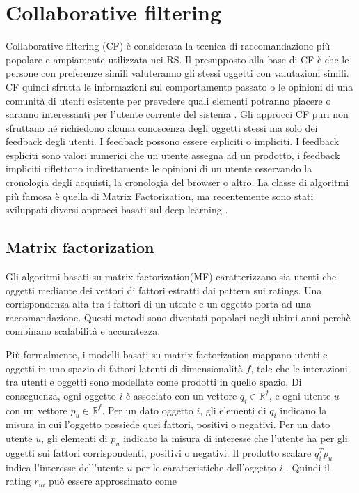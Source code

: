 \documentclass[12pt,italian]{report}
\begin{document}
\section{Collaborative filtering}
Collaborative filtering (CF) è considerata la tecnica di raccomandazione più popolare e ampiamente utilizzata nei RS. Il presupposto alla base di CF è che le persone con preferenze simili valuteranno gli stessi oggetti con valutazioni simili. CF quindi sfrutta le informazioni sul comportamento passato o le opinioni di una comunità di utenti esistente per prevedere quali elementi potranno piacere o saranno interessanti per l'utente corrente del sistema \cite{recsys-intro}. Gli approcci CF puri non sfruttano né richiedono alcuna conoscenza degli oggetti stessi ma solo dei feedback degli utenti. I feedback possono essere espliciti o impliciti. I feedback espliciti sono valori numerici che un utente assegna ad un prodotto, i feedback impliciti riflettono indirettamente le opinioni di un utente osservando la cronologia degli acquisti, la cronologia del browser o altro. 
La classe di algoritmi più famosa è quella di Matrix Factorization, ma recentemente sono stati sviluppati diversi approcci basati sul deep learning \cite{deep-learning-survey}.


\subsection{Matrix factorization}
Gli algoritmi basati su matrix factorization(MF) caratterizzano sia utenti che oggetti mediante dei vettori di fattori estratti dai pattern sui ratings. Una corrispondenza alta tra i fattori di un utente e un oggetto porta ad una raccomandazione. Questi metodi sono diventati popolari negli ultimi anni perchè combinano scalabilità e accuratezza.

Più formalmente, i modelli basati su matrix factorization mappano utenti e oggetti in uno spazio di fattori latenti di dimensionalità $f$, tale che le interazioni tra utenti e oggetti sono modellate come prodotti in quello spazio. Di conseguenza, ogni oggetto $i$ è associato con un vettore $q_i \in \mathbb{R}^f$, e ogni utente $u$ con un vettore $p_u \in \mathbb{R}^f$. Per un dato oggetto $i$, gli elementi di $q_i$ indicano la misura in cui l'oggetto possiede quei fattori, positivi o negativi. Per un dato utente $u$, gli elementi di $p_u$ indicato la misura di interesse che l'utente ha per gli oggetti sui fattori corrispondenti, positivi o negativi. Il prodotto scalare $q_i^Tp_u$ indica l'interesse dell'utente $u$ per le caratteristiche dell'oggetto $i$ \cite{matrix-factorization}. Quindi il rating $r_{ui}$ può essere approssimato come
\end{document}
